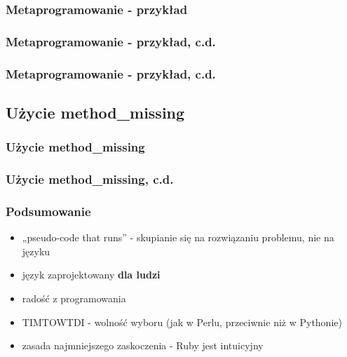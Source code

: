 \documentclass[12t]{beamer}
\begin{document}
\begin{frame}[fragile]
  \frametitle{Metaprogramowanie - przykład}
  
\end{frame}

\begin{frame}[fragile]
  \frametitle{Metaprogramowanie - przykład, c.d.}
  
\end{frame}

\begin{frame}[fragile]
  \frametitle{Metaprogramowanie - przykład, c.d.}
  
\end{frame}

\subsection{Użycie method\_missing}
\begin{frame}[fragile]
  \frametitle{Użycie method\_missing}
  
\end{frame}

\begin{frame}[fragile]
  \frametitle{Użycie method\_missing, c.d.}
  
\end{frame}

\begin{frame}
  \frametitle{Podsumowanie}
  \begin{itemize}
  \item „pseudo-code that runs” - skupianie się na rozwiązaniu
    problemu, nie na języku
  \item język zaprojektowany \textbf{dla ludzi}
  \item radość z programowania
  \item TIMTOWTDI - wolność wyboru (jak w Perlu, przeciwnie niż w
    Pythonie)
  \item zasada najmniejszego zaskoczenia - Ruby jest intuicyjny
  \end{itemize}
\end{frame}
\end{document}
